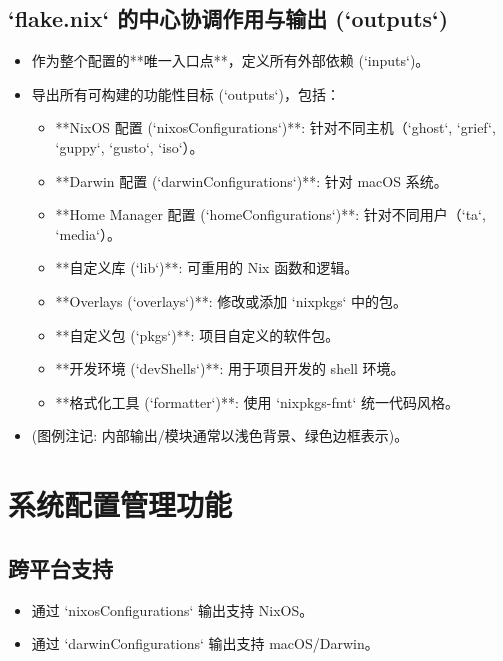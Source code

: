 \documentclass[11pt, a4paper]{article}
\begin{document}
    \subsection{`flake.nix` 的中心协调作用与输出 (`outputs`)}
        \begin{itemize}
            \item 作为整个配置的**唯一入口点**，定义所有外部依赖 (`inputs`)。
            \item 导出所有可构建的功能性目标 (`outputs`)，包括：
                \begin{itemize}
                    \item **NixOS 配置 (`nixosConfigurations`)**: 针对不同主机（`ghost`, `grief`, `guppy`, `gusto`, `iso`）。
                    \item **Darwin 配置 (`darwinConfigurations`)**: 针对 macOS 系统。
                    \item **Home Manager 配置 (`homeConfigurations`)**: 针对不同用户（`ta`, `media`）。
                    \item **自定义库 (`lib`)**: 可重用的 Nix 函数和逻辑。
                    \item **Overlays (`overlays`)**: 修改或添加 `nixpkgs` 中的包。
                    \item **自定义包 (`pkgs`)**: 项目自定义的软件包。
                    \item **开发环境 (`devShells`)**: 用于项目开发的 shell 环境。
                    \item **格式化工具 (`formatter`)**: 使用 `nixpkgs-fmt` 统一代码风格。
                \end{itemize}
            \item (图例注记: 内部输出/模块通常以浅色背景、绿色边框表示)。
        \end{itemize}

\section{系统配置管理功能}
    \subsection{跨平台支持}
        \begin{itemize}
            \item 通过 `nixosConfigurations` 输出支持 NixOS。
            \item 通过 `darwinConfigurations` 输出支持 macOS/Darwin。
        \end{itemize}
\end{document}
